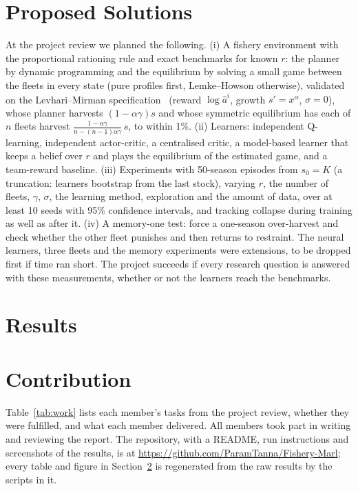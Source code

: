 \documentclass{article}
\begin{document}
\section{Proposed Solutions}
\label{sec:solutions}
At the project review we planned the following. (i) A fishery environment with the proportional rationing rule and exact benchmarks for known $r$: the planner by dynamic programming and the equilibrium by solving a small game between the fleets in every state (pure profiles first, Lemke--Howson otherwise), validated on the Levhari--Mirman specification~\cite{levhari1980} (reward $\log\hat a^i$, growth $s'=x^{\alpha}$, $\sigma=0$), whose planner harvests $(1-\alpha\gamma)s$ and whose symmetric equilibrium has each of $n$ fleets harvest $\frac{1-\alpha\gamma}{n-(n-1)\alpha\gamma}\,s$, to within 1\%. (ii) Learners: independent Q-learning, independent actor-critic, a centralised critic, a model-based learner that keeps a belief over $r$ and plays the equilibrium of the estimated game, and a team-reward baseline. (iii) Experiments with 50-season episodes from $s_0=K$ (a truncation: learners bootstrap from the last stock), varying $r$, the number of fleets, $\gamma$, $\sigma$, the learning method, exploration and the amount of data, over at least 10 seeds with 95\% confidence intervals, and tracking collapse during training as well as after it. (iv) A memory-one test: force a one-season over-harvest and check whether the other fleet punishes and then returns to restraint. The neural learners, three fleets and the memory experiments were extensions, to be dropped first if time ran short. The project succeeds if every research question is answered with these measurements, whether or not the learners reach the benchmarks.



\section{Results}
\label{sec:results}


\section{Contribution}
\label{sec:contrib}
Table~\ref{tab:work} lists each member's tasks from the project review, whether they were fulfilled, and what each member delivered. All members took part in writing and reviewing the report. The repository, with a README, run instructions and screenshots of the results, is at \url{https://github.com/ParamTanna/Fishery-Marl}; every table and figure in Section~\ref{sec:results} is regenerated from the raw results by the scripts in it.
\end{document}
